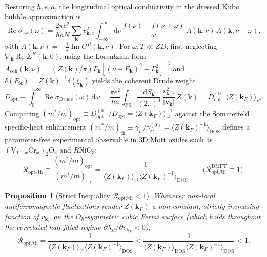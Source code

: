 \documentclass[11pt,a4paper]{article}
\numberwithin{equation}{section}
\theoremstyle{plain}
\newtheorem{proposition}{Proposition}[section]
\theoremstyle{definition}
\providecommand{\vk}{\mathbf{k}}
\providecommand{\vv}{\mathbf{v}}
\providecommand{\im}{\operatorname{Im}}
\providecommand{\re}{\operatorname{Re}}
\providecommand{\dd}{\mathrm{d}}
\begin{document}
Restoring $\hbar, e, a$, the longitudinal optical conductivity in the dressed Kubo
bubble approximation is
\begin{equation}
    \re\sigma_{xx}(\omega)
    = \frac{2\pi e^2}{\hbar a N} \sum_{\vk} v_{\vk, x}^2
      \int_{-\infty}^{\infty} \dd\nu\,
      \frac{f(\nu) - f(\nu+\omega)}{\omega}\,
      A(\vk,\nu)\, A(\vk,\nu+\omega),
    \label{eq:kubo}
\end{equation}
with $A(\vk,\nu) = -\frac{1}{\pi}\im G^R(\vk,\nu)$. For $\omega, T \ll \bar{Z}D$,
first neglecting $\nabla_{\vk}\re\Sigma^R(\vk,0)$, using
the Lorentzian form $A_{\mathrm{coh}}(\vk,\nu) = (Z(\vk)/\pi)\Gamma_{\vk}[(\nu - E_{\vk})^2 + \Gamma_{\vk}^2]^{-1}$
and $\delta(E_{\vk}) = Z(\vk)^{-1}\delta(\xi_{\vk})$ yields the coherent Drude weight
\begin{equation}
    D_{\mathrm{opt}}
    \equiv \int_0^\infty \re\sigma_{\mathrm{Drude}}(\omega)\,\dd\omega
    = \frac{\pi e^2}{\hbar a} \int_{\mathrm{FS}} \frac{\dd S_{\vk}}{(2\pi)^3}\,
      \frac{v_{\vk, x}^2}{|\vv_{\vk}|}\, Z(\vk)
    = D_{\mathrm{opt}}^{(0)} \bigl\langle Z(\vk_F) \bigr\rangle_{v^2}.
    \label{eq:D_opt}
\end{equation}
Comparing $(m^*/m)_{\mathrm{opt}} \equiv D_{\mathrm{opt}}^{(0)}/D_{\mathrm{opt}} = \langle Z(\vk_F)\rangle_{v^2}^{-1}$
against the Sommerfeld specific-heat enhancement
$(m^*/m)_{\mathrm{th}} \equiv \gamma_C/\gamma_C^{(0)} = \langle Z(\vk_F)^{-1}\rangle_{\mathrm{DOS}}$
defines a parameter-free experimental observable in 3D Mott oxides such as
$(\mathrm{V}_{1-x}\mathrm{Cr}_x)_2\mathrm{O}_3$ and $R\mathrm{NiO}_3$:
\begin{equation}
    \mathcal{R}_{\mathrm{opt/th}}
    \equiv \frac{(m^*/m)_{\mathrm{opt}}}{(m^*/m)_{\mathrm{th}}}
    = \frac{1}{\bigl\langle Z(\vk_F) \bigr\rangle_{v^2}
               \bigl\langle Z(\vk_F)^{-1} \bigr\rangle_{\mathrm{DOS}}}
    \qquad \bigl(\mathcal{R}_{\mathrm{opt/th}}^{\mathrm{DMFT}} \equiv 1\bigr).
    \label{eq:R_ratio}
\end{equation}

\begin{proposition}[Strict Inequality $\mathcal{R}_{\mathrm{opt/th}} < 1$]
Whenever non-local antiferromagnetic fluctuations render $Z(\vk_F)$ a non-constant,
strictly increasing function of $v_{\vk_F}$ on the $O_h$-symmetric cubic Fermi surface
(which holds throughout the correlated half-filled regime $\partial\lambda_{\mathrm{sf}}/\partial v_{\vk_F} < 0$),
\begin{equation}
    \mathcal{R}_{\mathrm{opt/th}}
    = \frac{1}{\langle Z(\vk_F)\rangle_{v^2}\langle Z(\vk_F)^{-1}\rangle_{\mathrm{DOS}}}
    < \frac{1}{\langle Z(\vk_F)\rangle_{\mathrm{DOS}}\langle Z(\vk_F)^{-1}\rangle_{\mathrm{DOS}}}
    < 1.
    \label{eq:R_strict}
\end{equation}
\end{proposition}
\end{document}
